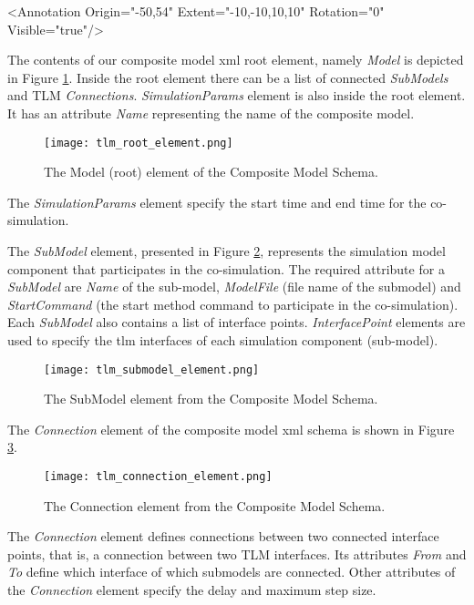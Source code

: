 <Annotation Origin="{-50,54}" Extent="{-10,-10,10,10}" Rotation="0" Visible="true"/>

The contents of our composite model \acrshort{xml} root element, namely \textit{Model} is depicted in Figure \ref{fig:tlmerootelement}. Inside the root element there can be a list of connected \textit{SubModels} and TLM \textit{Connections}. \textit{SimulationParams} element is also inside the root element. It has an attribute \textit{Name} representing the name of the composite model.

\begin{figure}
	\texttt{[image: tlm\_root\_element.png]}
	\caption{The Model (root) element of the Composite Model Schema.}
	\label{fig:tlmerootelement}
\end{figure}


The \textit{SimulationParams} element specify the start time and end time for the co-simulation.

The \textit{SubModel} element, presented in Figure \ref{fig:tlmsubmodelelement}, represents the simulation model component that participates in the co-simulation. The required attribute for a \textit{SubModel} are \textit{Name} of the sub-model, \textit{ModelFile} (file name of the submodel) and \textit{StartCommand} (the start method command to participate in the co-simulation). Each \textit{SubModel} also contains a list of interface points. \textit{InterfacePoint} elements are used to specify the \acrshort{tlm} interfaces of each simulation component (sub-model). 

\begin{figure}
	\texttt{[image: tlm\_submodel\_element.png]}
	\caption{The SubModel element from the Composite Model Schema.}
	\label{fig:tlmsubmodelelement}
\end{figure}

The \textit{Connection} element of the composite model \acrshort{xml} schema is shown in Figure \ref{fig:tlmconnectionelement}.

\begin{figure}
	\texttt{[image: tlm\_connection\_element.png]}
	\caption{The Connection element from the Composite Model Schema.}
	\label{fig:tlmconnectionelement}
\end{figure}

The \textit{Connection} element defines connections between two connected interface points, that is, 
a connection between two TLM interfaces. Its attributes \textit{From} and \textit{To} define which interface of which submodels are connected. Other attributes of the \textit{Connection} element specify the delay and maximum step size. 

